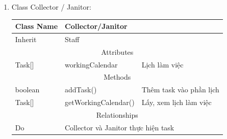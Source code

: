 \begin{enumerate}
        \item Class Collector / Janitor:
        \begin{table}[htp]
            \begin{tabular}{|lll|}
                \hline
                \multicolumn{1}{|l|}{Class Name} & \multicolumn{2}{l|}{Collector/Janitor}                              \\ \hline
                \multicolumn{1}{|l|}{Inherit}    & \multicolumn{2}{l|}{Staff}                                          \\ \hline
                \multicolumn{3}{|c|}{\cellcolor[HTML]{FFFFC7}Attributes}                                               \\ \hline
                \multicolumn{1}{|l|}{Task{[}{]}} & \multicolumn{1}{l|}{workingCalendar}      & Lịch làm việc           \\ \hline
                \multicolumn{3}{|c|}{\cellcolor[HTML]{FFFFC7}Methods}                                                  \\ \hline
                \multicolumn{1}{|l|}{boolean}    & \multicolumn{1}{l|}{addTask()}            & Thêm task vào phần lịch \\ \hline
                \multicolumn{1}{|l|}{Task{[}{]}} & \multicolumn{1}{l|}{getWorkingCalendar()} & Lấy, xem lịch làm việc  \\ \hline
                \multicolumn{3}{|c|}{\cellcolor[HTML]{FFFFC7}Relationships}                                            \\ \hline
                \multicolumn{1}{|l|}{Do}         & \multicolumn{2}{l|}{Collector và Janitor thực hiện task}            \\ \hline
            \end{tabular}
        \end{table}
           

\end{enumerate}
